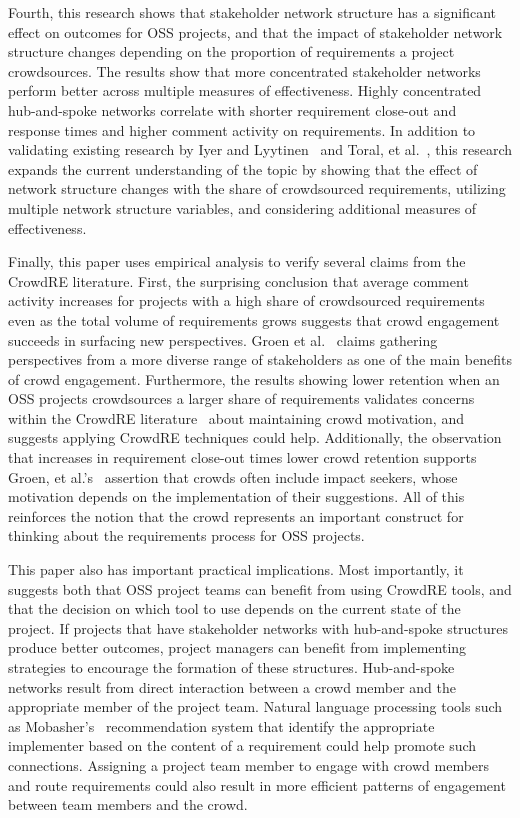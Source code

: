 Fourth, this research shows that stakeholder network structure has a significant effect on outcomes for OSS projects, and that the impact of stakeholder network structure changes depending on the proportion of requirements a project crowdsources. The results show that more concentrated stakeholder networks perform better across multiple measures of effectiveness. Highly concentrated hub-and-spoke networks correlate with shorter requirement close-out and response times and higher comment activity on requirements. In addition to validating existing research by Iyer and Lyytinen~\cite{iyer} and Toral, et al.~\cite{toral}, this research expands the current understanding of the topic by showing that the effect of network structure changes with the share of crowdsourced requirements, utilizing multiple network structure variables, and considering additional measures of effectiveness.

Finally, this paper uses empirical analysis to verify several claims from the CrowdRE literature. First, the surprising conclusion that average comment activity increases for projects with a high share of crowdsourced requirements even as the total volume of requirements grows suggests that crowd engagement succeeds in surfacing new perspectives. Groen et al.~\cite{groen} claims gathering perspectives from a more diverse range of stakeholders as one of the main benefits of crowd engagement. Furthermore, the results showing lower retention when an OSS projects crowdsources a larger share of requirements validates concerns within the \mbox{CrowdRE} literature~\cite{snijders, snijders2, levy} about maintaining crowd motivation, and suggests applying CrowdRE techniques could help. Additionally, the observation that increases in requirement close-out times lower crowd retention supports Groen, et al.'s~\cite{groen} assertion that crowds often include impact seekers, whose motivation depends on the implementation of their suggestions. All of this reinforces the notion that the crowd represents an important construct for thinking about the requirements process for OSS projects.

This paper also has important practical implications. Most importantly, it suggests both that OSS project teams can benefit from using CrowdRE tools, and that the decision on which tool to use depends on the current state of the project. If projects that have stakeholder networks with hub-and-spoke structures produce better outcomes, project managers can benefit from implementing strategies to encourage the formation of these structures. Hub-and-spoke networks result from direct interaction between a crowd member and the appropriate member of the project team. Natural language processing tools such as Mobasher's~\cite{mobasher} recommendation system that identify the appropriate implementer based on the content of a requirement could help promote such connections. Assigning a project team member to engage with crowd members and route requirements could also result in more efficient patterns of engagement between team members and the crowd.

